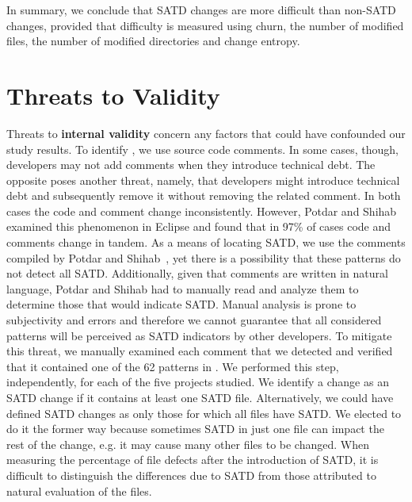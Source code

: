 In summary, we conclude that SATD changes are more difficult than non-SATD changes, provided that difficulty is measured using churn, the number of modified files, the number of modified directories and change entropy.







\section{Threats to Validity}
\label{chap3:sec:threats_to_validity}

Threats  to {\bf  internal validity}  concern any factors that could have confounded our study results. To identify \SATD, we use source code comments. In some cases, though, developers may not add comments when they introduce technical debt. The opposite poses another threat, namely, that developers might introduce technical debt and subsequently remove it without removing the related comment. In both cases the code and comment change inconsistently. However, Potdar and Shihab~\cite{ICSM_PotdarS14} examined this phenomenon in Eclipse and found that in 97\% of cases code and comments change in tandem. As a means of locating SATD, we use the comments compiled by Potdar and Shihab~\cite{ICSM_PotdarS14}, yet there is a possibility that these patterns do not detect all SATD. Additionally, given that comments are written in natural language, Potdar and Shihab had to manually read and analyze them to determine those that would indicate SATD. Manual analysis is prone to subjectivity and errors and therefore we cannot guarantee that all considered patterns will be perceived as SATD indicators by other developers. To mitigate this threat, we manually examined each comment that we detected and verified that it contained one of the 62 patterns in \cite{ICSM_PotdarS14}. We performed this step, independently, for each of the five projects studied. We identify a change as an SATD change if it contains at least one SATD file. Alternatively, we could have defined SATD changes as only those for which all files have SATD. We elected to do it the former way because sometimes SATD in just one file can impact the rest of the change, e.g. it may cause many other files to be changed. When measuring the percentage of file defects after the introduction of SATD, it is difficult to distinguish the differences due to SATD from those attributed to natural evaluation of the files.



